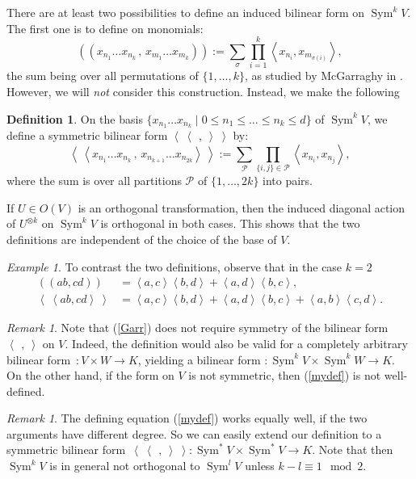 \documentclass{amsart}
\DeclareMathOperator{\Sym}{Sym}
\newcommand{\coloneqq}{:=}
\newcommand{\bra}{\left<\!\!\!\:\left<}
\newcommand{\ket}{\right>\!\!\!\:\right>}
\theoremstyle{plain}
\theoremstyle{definition}
\newtheorem{definition}[theorem]{Definition}
\theoremstyle{remark}
\newtheorem{remark}[theorem]{Remark}
\newtheorem{example}[theorem]{Example}
\begin{document}
There are at least two possibilities to define an induced bilinear form on $\Sym^kV$. The first one is to define on monomials:
\begin{equation}\label{Garr}
\left(\!\left( x_{n_1}\ldots x_{n_k}\,,\, x_{m_1}\ldots x_{m_k}\right)\!\right) \coloneqq \sum_\sigma  
\prod_{i=1}^k \left< x_{n_i},x_{m_{\sigma(i)}}\right>,
\end{equation}
the sum being over all permutations of $\{1,\ldots,k\}$, as studied by McGarraghy in \cite{McGarr}. However, we will \emph{not} consider 
this construction. Instead, we make the following
\begin{definition} \label{formdef} On the basis $\{x_{n_1}\ldots x_{n_k}\;|\;0\leq n_1\leq\ldots\leq n_k\leq d\}$ of $\Sym^kV$, we define a symmetric bilinear form $\bra\ \,,\ \ket$ by: 
\begin{equation}
\label{mydef}
\bra x_{n_1}\ldots x_{n_k}\,,\,x_{n_{k+1}}\ldots x_{n_{2k}} \ket \coloneqq \sum_{\mathcal{P}} \prod_{\{i,j\}\in\mathcal{P}} \left<x_{n_i},x_{n_j}\right>,
\end{equation}
where the sum is over all partitions $\mathcal{P}$ of $\{1,\ldots,2k\}$ into pairs.
\end{definition}
If $U\in O(V)$ is an orthogonal transformation, then the induced diagonal action of $U^{\otimes k}$ on $\Sym^kV$ is orthogonal in both cases. This shows that the two definitions are independent of the choice of the base of $V$. 
\begin{example}
To contrast the two definitions, observe that in the case $k=2$
\begin{align}
\left(\!\left( ab,cd \right)\!\right) &= \left<a,c\right>\left<b,d\right>+\left<a,d\right>\left<b,c\right>, \\
\bra ab,cd\ket &= \left<a,c\right>\left<b,d\right>+\left<a,d\right>\left<b,c\right> + \left<a,b\right>\left<c,d\right>.
\end{align}
\end{example}
\begin{remark}
Note that (\ref{Garr}) does not require symmetry of the bilinear form $\left<\,\ ,\ \right>$ on $V$. Indeed, the definition would also be valid for a completely arbitrary bilinear form~$: V\times W \rightarrow K$, yielding a bilinear form $:\Sym^kV\times\Sym^kW\rightarrow K$. On the other hand, if the form on $V$ is not symmetric, then (\ref{mydef}) is not well-defined.
\end{remark}
\begin{remark}
The defining equation (\ref{mydef}) works equally well, if the two arguments have different degree. So we can easily extend our definition to a symmetric bilinear form~$\bra\ \,,\ \ket:\Sym^*V\times\Sym^*V \rightarrow K$. Note that then $\Sym^kV$ is in general not orthogonal to $\Sym^lV$ unless $k-l \equiv 1 \mod{2}$.
\end{remark}
\end{document}
